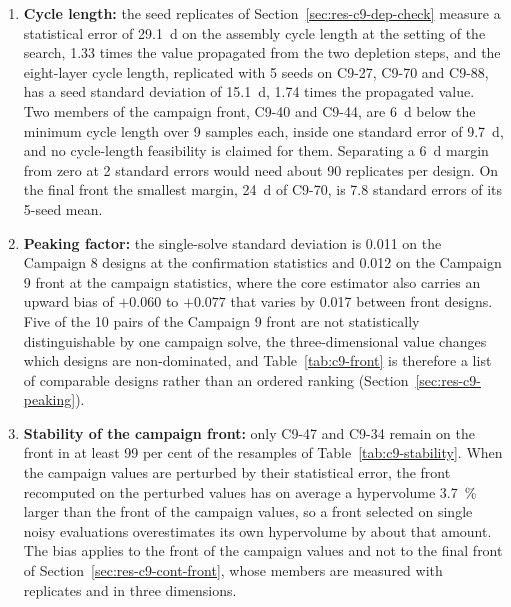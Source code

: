 \begin{enumerate}
  \item \textbf{Cycle length:} the seed replicates of
        Section~\ref{sec:res-c9-dep-check} measure a statistical error
        of \SI{29.1}{d} on the assembly cycle length at the setting of
        the search, 1.33 times the value
        propagated from the two depletion steps, and the eight-layer
        cycle length, replicated with 5 seeds on C9-27, C9-70 and C9-88,
        has a seed standard deviation of \SI{15.1}{d}, 1.74 times the
        propagated value. Two
        members of the campaign front, C9-40 and C9-44, are \SI{6}{d}
        below the minimum cycle length over 9 samples each, inside
        one standard error of \SI{9.7}{d}, and no cycle-length
        feasibility is claimed for them. Separating a \SI{6}{d} margin
        from zero at 2 standard errors would need about 90
        replicates per design. On the final front the smallest margin,
        \SI{24}{d} of C9-70, is 7.8 standard errors of its 5-seed mean.

  \item \textbf{Peaking factor:} the single-solve standard deviation is
        0.011 on the Campaign 8 designs at the confirmation statistics
        and 0.012 on the Campaign 9 front at the campaign statistics,
        where the core estimator also carries an upward bias of
        $+0.060$ to $+0.077$ that varies by 0.017 between front
        designs. Five of the 10 pairs of the Campaign 9 front are not
        statistically distinguishable by one campaign solve, the
        three-dimensional value changes which designs are
        non-dominated, and Table~\ref{tab:c9-front} is therefore a list
        of comparable designs rather than an ordered ranking
        (Section~\ref{sec:res-c9-peaking}).

    \item \textbf{Stability of the campaign front:} only C9-47 and C9-34
        remain on the front in at least 99 per cent of the resamples of
        Table~\ref{tab:c9-stability}. When the campaign values are
        perturbed by their statistical error, the front recomputed on
        the perturbed values has on average a hypervolume
        \SI{3.7}{\%} larger than the front of the campaign values, so a
        front selected on single noisy evaluations overestimates its own
        hypervolume by about that amount. The bias applies to the front
        of the campaign values and not to the final front of
        Section~\ref{sec:res-c9-cont-front}, whose members are measured
        with replicates and in three dimensions.


\end{enumerate}
